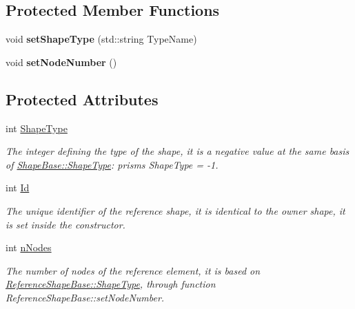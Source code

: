 \subsection*{Protected Member Functions}
\begin{DoxyCompactItemize}
\item 
\hypertarget{classReferenceShapeBase_aa582a1e9264afcb37e4d0baa06b88a51}{}void {\bfseries set\+Shape\+Type} (std\+::string Type\+Name)\label{classReferenceShapeBase_aa582a1e9264afcb37e4d0baa06b88a51}

\item 
\hypertarget{classReferenceShapeBase_a027db08b5e580286448380aa21902b33}{}void {\bfseries set\+Node\+Number} ()\label{classReferenceShapeBase_a027db08b5e580286448380aa21902b33}

\end{DoxyCompactItemize}
\subsection*{Protected Attributes}
\begin{DoxyCompactItemize}
\item 
\hypertarget{classReferenceShapeBase_a4831a54cffbafef4ded26fb8c50566e0}{}int \hyperlink{classReferenceShapeBase_a4831a54cffbafef4ded26fb8c50566e0}{Shape\+Type}\label{classReferenceShapeBase_a4831a54cffbafef4ded26fb8c50566e0}

\begin{DoxyCompactList}\small\item\em The integer defining the type of the shape, it is a negative value at the same basis of \hyperlink{classShapeBase_a36aedd41e8465a186a0b0c454b5b76f3}{Shape\+Base\+::\+Shape\+Type}\+: prisms Shape\+Type = -\/1. \end{DoxyCompactList}\item 
\hypertarget{classReferenceShapeBase_af0da93cee3f17800d7aa90b21b1b81c7}{}int \hyperlink{classReferenceShapeBase_af0da93cee3f17800d7aa90b21b1b81c7}{Id}\label{classReferenceShapeBase_af0da93cee3f17800d7aa90b21b1b81c7}

\begin{DoxyCompactList}\small\item\em The unique identifier of the reference shape, it is identical to the owner shape, it is set inside the constructor. \end{DoxyCompactList}\item 
\hypertarget{classReferenceShapeBase_a1183c092056a3245a350ff6f56632633}{}int \hyperlink{classReferenceShapeBase_a1183c092056a3245a350ff6f56632633}{n\+Nodes}\label{classReferenceShapeBase_a1183c092056a3245a350ff6f56632633}

\begin{DoxyCompactList}\small\item\em The number of nodes of the reference element, it is based on \hyperlink{classReferenceShapeBase_a4831a54cffbafef4ded26fb8c50566e0}{Reference\+Shape\+Base\+::\+Shape\+Type}, through function Reference\+Shape\+Base\+::set\+Node\+Number. \end{DoxyCompactList}\end{DoxyCompactItemize}



